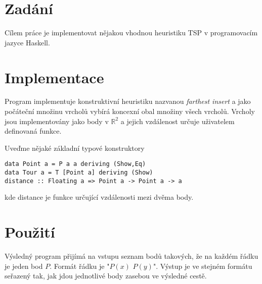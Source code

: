 \documentclass[11pt,twocolumn,a4paper]{article}
\begin{document}
\section{Zadání}

Cílem práce je implementovat nějakou vhodnou heuristiku TSP v programovacím jazyce Haskell.

\section{Implementace}

Program implementuje konstruktivní heuristiku nazvanou \emph{farthest insert} a jako počáteční množinu vrcholů vybírá koncexní obal množiny všech vrcholů. Vrcholy jsou implementovány jako body v $\mathbb{R}^2$ a jejich vzdálenost určuje uživatelem definovaná funkce.

Uveďme nějaké základní typové konstruktory
\begin{verbatim}
data Point a = P a a deriving (Show,Eq)
data Tour a = T [Point a] deriving (Show)
distance :: Floating a => Point a -> Point a -> a
\end{verbatim} 
kde distance je funkce určující vzdálenosti mezi dvěma body.

\section{Použití}

Výsledný program přijímá na vstupu seznam bodů takových, že na každém řádku je jeden bod $P$. Formát řádku je "$P(x)$ $P(y)$". 
Výstup je ve stejném formátu seřazený tak, jak jdou jednotlivé body zasebou ve výsledné cestě.
\end{document}

